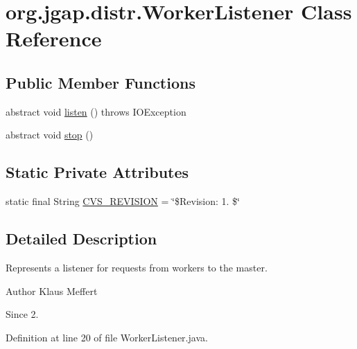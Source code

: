 \hypertarget{classorg_1_1jgap_1_1distr_1_1_worker_listener}{\section{org.\-jgap.\-distr.\-Worker\-Listener Class Reference}
\label{classorg_1_1jgap_1_1distr_1_1_worker_listener}
}
\subsection*{Public Member Functions}
\begin{DoxyCompactItemize}
\item 
abstract void \hyperlink{classorg_1_1jgap_1_1distr_1_1_worker_listener_af2012a49954490a49c9d601f5c876516}{listen} ()  throws I\-O\-Exception
\item 
abstract void \hyperlink{classorg_1_1jgap_1_1distr_1_1_worker_listener_a4fd16a35fda78417f1ddcfc8f1a9f424}{stop} ()
\end{DoxyCompactItemize}
\subsection*{Static Private Attributes}
\begin{DoxyCompactItemize}
\item 
static final String \hyperlink{classorg_1_1jgap_1_1distr_1_1_worker_listener_a6217dee2e483e6e76a532765831ab1e6}{C\-V\-S\-\_\-\-R\-E\-V\-I\-S\-I\-O\-N} = \char`\"{}\$Revision\-: 1. \$\char`\"{}
\end{DoxyCompactItemize}


\subsection{Detailed Description}
Represents a listener for requests from workers to the master.

\begin{DoxyAuthor}{Author}
Klaus Meffert 
\end{DoxyAuthor}
\begin{DoxySince}{Since}
2. 
\end{DoxySince}


Definition at line 20 of file Worker\-Listener.\-java.



